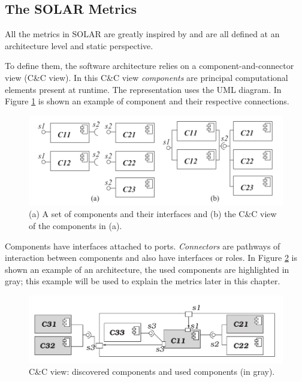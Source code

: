\subsection{The SOLAR Metrics}
All the metrics in SOLAR are greatly inspired by \cite{po-metrics} and are all defined at an architecture level and static perspective. 

To define them, the software architecture relies on a component-and-connector view (C\&C view). In this C\&C view \emph{components} are principal computational elements present at runtime. The representation uses the UML diagram. In Figure \ref{fig:comp-example} is shown an example of component and their respective connections.

\begin{figure}[h]
	\centerline
	{\includegraphics[scale=0.55]{img/solar-comp-example.png}}
	\caption[SOLAR Components example]{(a) A set of components and their interfaces and (b) the C\&C view of the components in (a).\cite{solar}}
	\label{fig:comp-example}
\end{figure}

Components have interfaces attached to ports. \emph{Connectors} are pathways of interaction between components and also have interfaces or roles. In Figure \ref{fig:solar-arch-example} is shown an example of an architecture, the used components are highlighted in gray; this example will be used to explain the metrics later in this chapter.

\begin{figure}[h]
	\centerline
	{\includegraphics[scale=0.55]{img/solar-arch-example.png}}
	\caption[SOLAR example architecure]{C\&C view: discovered components and used components (in gray).\cite{solar}}
	\label{fig:solar-arch-example}
\end{figure}

